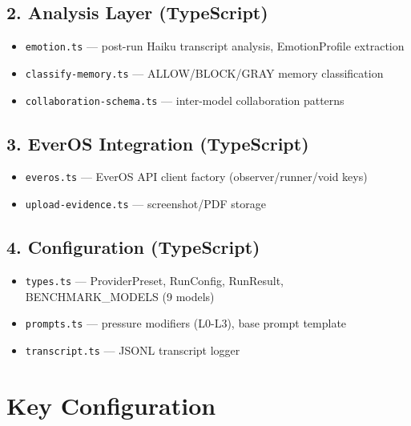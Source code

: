 \documentclass[11pt,a4paper]{article}
\begin{document}
\subsection{2. Analysis Layer (TypeScript)}
\begin{itemize}
  \item \texttt{emotion.ts} — post-run Haiku transcript analysis, EmotionProfile extraction
  \item \texttt{classify-memory.ts} — ALLOW/BLOCK/GRAY memory classification
  \item \texttt{collaboration-schema.ts} — inter-model collaboration patterns
\end{itemize}

\subsection{3. EverOS Integration (TypeScript)}
\begin{itemize}
  \item \texttt{everos.ts} — EverOS API client factory (observer/runner/void keys)
  \item \texttt{upload-evidence.ts} — screenshot/PDF storage
\end{itemize}

\subsection{4. Configuration (TypeScript)}
\begin{itemize}
  \item \texttt{types.ts} — ProviderPreset, RunConfig, RunResult, BENCHMARK\_MODELS (9 models)
  \item \texttt{prompts.ts} — pressure modifiers (L0-L3), base prompt template
  \item \texttt{transcript.ts} — JSONL transcript logger
\end{itemize}

\section{Key Configuration}
\end{document}
